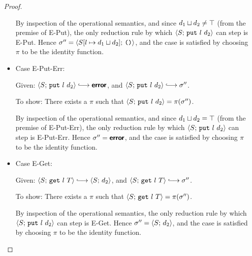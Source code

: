 \begin{proof}
\begin{itemize}
      By inspection of the operational semantics, and since
      $d_1 \sqcup d_2 \neq \top$ (from the premise of {\sc
      E-Put}), the only reduction rule by which
      $\langle S;\, \mbox{\texttt{put}}~l~d_2 \rangle$ can step is {\sc E-Put}.  Hence
      $\sigma'' = \langle S[l \mapsto d_1 \sqcup d_2];\, \mbox{\texttt{()}} \rangle$,
      and the case is satisfied by choosing $\pi$ to be the identity
      function.

      \item Case {\sc E-Put-Err}:

      Given: $\config{S}{\putexp{l}{d_2}} \parstepsto \error$, and
      $\config{S}{\putexp{l}{d_2}} \parstepsto \conf''$.

      To show: There exists a $\pi$ such that
      $\langle S;\, \mbox{\texttt{put}}~l~d_2 \rangle = \pi(\sigma'')$.

      By inspection of the operational semantics, and since
      $d_1 \sqcup d_2 = \top$ (from the premise of {\sc
      E-Put-Err}), the only reduction rule by which
      $\langle S;\, \mbox{\texttt{put}}~l~d_2 \rangle$ can step is {\sc E-Put-Err}.
      Hence $\sigma'' = \textbf{\textsf{error}}$, and the case is satisfied by choosing
      $\pi$ to be the identity function.

      \item Case {\sc E-Get}:

      Given: $\config{S}{\getexp{l}{T}} \parstepsto \config{S}{d_2}$,
      and $\config{S}{\getexp{l}{T}} \parstepsto \conf''$.

      To show: There exists a $\pi$ such that
      $\langle S;\, \mbox{\texttt{get}}~l~T \rangle = \pi(\sigma'')$.

      By inspection of the operational semantics, the only reduction
      rule by which $\langle S;\, \mbox{\texttt{put}}~l~d_2 \rangle$ can step is {\sc
      E-Get}.  Hence $\sigma'' = \langle S;\, d_2 \rangle$, and the case is
      satisfied by choosing $\pi$ to be the identity
      function.

  \end{itemize}
\end{proof}

